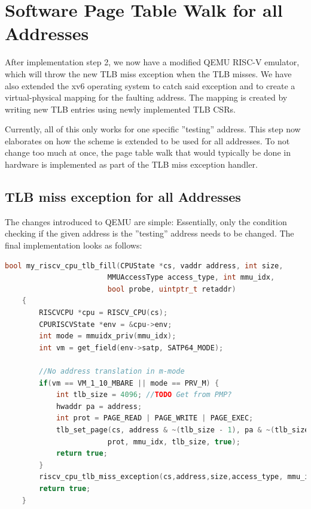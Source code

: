 \section{Software Page Table Walk for all Addresses}
After implementation step 2, we now have a modified QEMU RISC-V emulator, which will throw the new
TLB miss exception when the TLB misses.
We have also extended the xv6 operating system to catch said exception and to create a virtual-physical
mapping for the faulting address.
The mapping is created by writing new TLB entries using newly implemented TLB CSRs.

Currently, all of this only works for one specific ''testing'' address. This step now elaborates on
how the scheme is extended to be used for all addresses.
To not change too much at once, the page table walk that would typically be done in hardware is
implemented as part of the TLB miss exception handler.

\subsection{TLB miss exception for all Addresses}
The changes introduced to QEMU are simple: Essentially, only the condition checking if the given address is
the ''testing'' address needs to be changed.
The final implementation looks as follows:

\begin{lstlisting}[language=c,float=h!,
    caption={},
    label={lst:updatedTLBFill}]
    bool my_riscv_cpu_tlb_fill(CPUState *cs, vaddr address, int size,
                        MMUAccessType access_type, int mmu_idx,
                        bool probe, uintptr_t retaddr)
    {
        RISCVCPU *cpu = RISCV_CPU(cs);
        CPURISCVState *env = &cpu->env;
        int mode = mmuidx_priv(mmu_idx);
        int vm = get_field(env->satp, SATP64_MODE);

        //No address translation in m-mode
        if(vm == VM_1_10_MBARE || mode == PRV_M) {
            int tlb_size = 4096; //TODO Get from PMP?
            hwaddr pa = address;
            int prot = PAGE_READ | PAGE_WRITE | PAGE_EXEC;
            tlb_set_page(cs, address & ~(tlb_size - 1), pa & ~(tlb_size - 1),
                        prot, mmu_idx, tlb_size, true);
            return true;
        }
        riscv_cpu_tlb_miss_exception(cs,address,size,access_type, mmu_idx, probe, retaddr);
        return true;
    }
\end{lstlisting}


